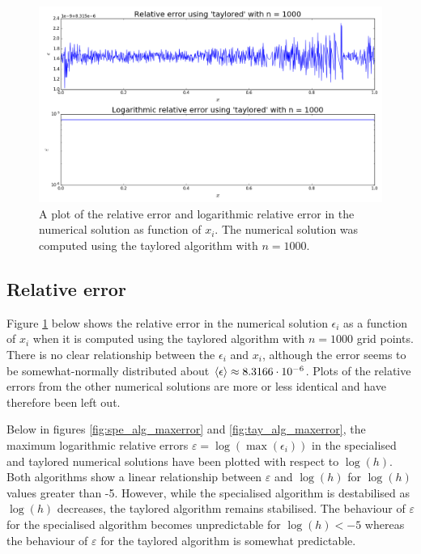 \documentclass[reprint,english]{revtex4-1}
\begin{document}
\clearpage
\onecolumngrid

\begin{figure}[ht]
\centering
\includegraphics[scale=0.42]{figures/taylored_1000_error.png}
\caption{A plot of the relative error and logarithmic relative error in the numerical solution as function of \(x_i\). The numerical solution was computed using the taylored algorithm with \(n=1000\).}\label{fig:tay_alg_error_n1000}
\end{figure}
\twocolumngrid
\subsection{Relative error}
Figure \ref{fig:tay_alg_error_n1000} below shows the relative error in the numerical solution \(\epsilon_i\) as a function of \(x_i\) when it is computed using the taylored algorithm with \(n=1000\) grid points. There is no clear relationship between the \(\epsilon_i\) and \(x_i\), although the error seems to be somewhat-normally distributed about \(\expval{\epsilon}\approx8.3166\cdot10^{-6}\). Plots of the relative errors from the other numerical solutions are more or less identical and have therefore been left out.

Below in figures \ref{fig:spe_alg_maxerror} and \ref{fig:tay_alg_maxerror}, the maximum logarithmic relative errors \(\varepsilon=\log(\max(\epsilon_i))\) in the specialised and taylored numerical solutions have been plotted with respect to \(\log(h)\). Both algorithms show a linear relationship between \(\varepsilon\) and \(\log(h)\) for \(\log(h)\) values greater than -5. However, while the specialised algorithm is destabilised as \(\log(h)\) decreases, the taylored algorithm remains stabilised. The behaviour of \(\varepsilon\) for the specialised algorithm becomes unpredictable for \(\log(h)<-5\) whereas the behaviour of \(\varepsilon\) for the taylored algorithm is somewhat predictable.
\newpage
\end{document}
